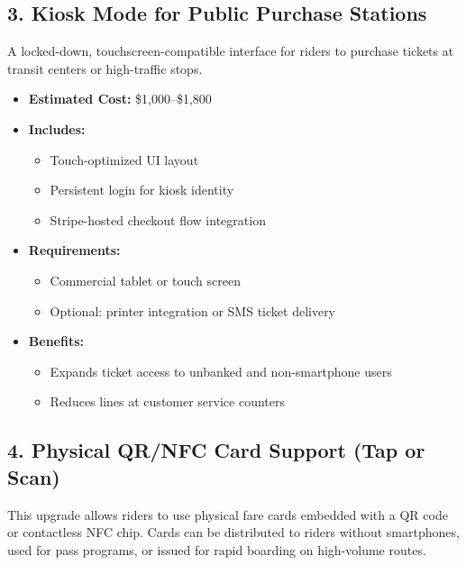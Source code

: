 \documentclass[12pt]{article}
\begin{document}
\subsection*{3. Kiosk Mode for Public Purchase Stations}

A locked-down, touchscreen-compatible interface for riders to purchase tickets at transit centers or high-traffic stops.

\begin{itemize}
    \item \textbf{Estimated Cost:} \$1,000–\$1,800
    \item \textbf{Includes:}
    \begin{itemize}
        \item Touch-optimized UI layout
        \item Persistent login for kiosk identity
        \item Stripe-hosted checkout flow integration
    \end{itemize}
    \item \textbf{Requirements:}
    \begin{itemize}
        \item Commercial tablet or touch screen
        \item Optional: printer integration or SMS ticket delivery
    \end{itemize}
    \item \textbf{Benefits:}
    \begin{itemize}
        \item Expands ticket access to unbanked and non-smartphone users
        \item Reduces lines at customer service counters
    \end{itemize}
\end{itemize}

\subsection*{4. Physical QR/NFC Card Support (Tap or Scan)}

This upgrade allows riders to use physical fare cards embedded with a QR code or contactless NFC chip. Cards can be distributed to riders without smartphones, used for pass programs, or issued for rapid boarding on high-volume routes.
\end{document}

